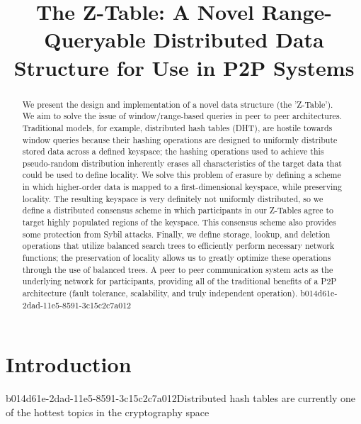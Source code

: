 \documentclass[12pt]{article}
\title{The Z-Table: A Novel Range-Queryable Distributed Data Structure for Use in P2P Systems}
\begin{document}
\maketitle

\begin{abstract}
We present the design and implementation of a novel data structure (the 'Z-Table'). We aim to solve the issue of window/range-based queries in peer to peer architectures. Traditional models, for example,  distributed hash tables (DHT), are hostile towards window queries because their hashing operations are designed to uniformly distribute stored data across a defined keyspace; the hashing operations used to achieve this pseudo-random distribution inherently erases all characteristics of the target data that could be used to define locality. We solve this problem of erasure by defining a scheme in which higher-order data is mapped to a first-dimensional keyspace, while preserving locality. The resulting keyspace is very definitely not uniformly distributed, so we define a distributed consensus scheme in which participants in our Z-Tables agree to target highly populated regions of the keyspace. This consensus scheme also provides some protection from Sybil attacks. Finally, we define storage, lookup, and deletion operations that utilize balanced search trees to efficiently perform necessary network functions; the preservation of locality allows us to greatly optimize these operations through the use of balanced trees. A peer to peer communication system acts as the underlying network for participants, providing all of the traditional benefits of a P2P architecture (fault tolerance, scalability, and truly independent operation).
b014d61e-2dad-11e5-8591-3c15c2c7a012\end{abstract}


\newpage
\section{Introduction}
b014d61e-2dad-11e5-8591-3c15c2c7a012Distributed hash tables are currently one of the hottest topics in the cryptography space~\cite{Stoica:2001dj,Rowstron:2001ea,Ratnasamy:2001wn}

\printbibliography
\end{document}

